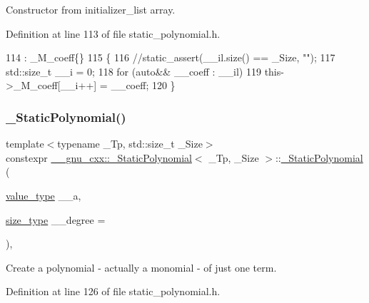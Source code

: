 Constructor from initializer\+\_\+list array. 

Definition at line 113 of file static\+\_\+polynomial.\+h.


\begin{DoxyCode}
114       : \_M\_coeff\{\}
115       \{
116         \textcolor{comment}{//static\_assert(\_\_il.size() == \_Size, "");}
117         std::size\_t \_\_i = 0;
118         \textcolor{keywordflow}{for} (\textcolor{keyword}{auto}&& \_\_coeff : \_\_il)
119           this->\_M\_coeff[\_\_i++] = \_\_coeff;
120       \}
\end{DoxyCode}
\mbox{\label{class____gnu__cxx_1_1__StaticPolynomial_a40180f74c050c65c9a61f18f0ea1f417}} 
\subsubsection{\texorpdfstring{\+\_\+\+Static\+Polynomial()}{\_StaticPolynomial()}\hspace{0.1cm}{\footnotesize\ttfamily [7/8]}}
{\footnotesize\ttfamily template$<$typename \+\_\+\+Tp, std\+::size\+\_\+t \+\_\+\+Size$>$ \\
constexpr \hyperlink{class____gnu__cxx_1_1__StaticPolynomial}{\+\_\+\+\_\+gnu\+\_\+cxx\+::\+\_\+\+Static\+Polynomial}$<$ \+\_\+\+Tp, \+\_\+\+Size $>$\+::\hyperlink{class____gnu__cxx_1_1__StaticPolynomial}{\+\_\+\+Static\+Polynomial} (\begin{DoxyParamCaption}\item[{\hyperlink{class____gnu__cxx_1_1__StaticPolynomial_aad5f3d6d5876b6926b30724aeac649d6}{value\+\_\+type}}]{\+\_\+\+\_\+a,  }\item[{\hyperlink{class____gnu__cxx_1_1__StaticPolynomial_a0cc0aa4adab35686ef2474e07f511ff9}{size\+\_\+type}}]{\+\_\+\+\_\+degree = {} }\end{DoxyParamCaption})\hspace{0.3cm}{\ttfamily [inline]}, {\ttfamily [explicit]}}

Create a polynomial -\/ actually a monomial -\/ of just one term. 

Definition at line 126 of file static\+\_\+polynomial.\+h.


